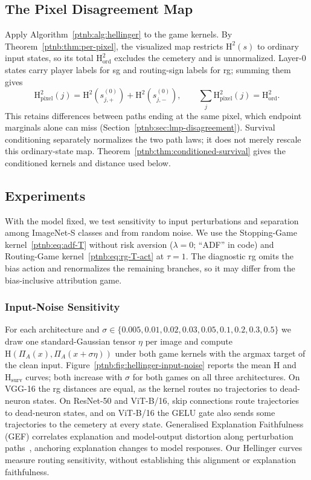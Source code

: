\subsection{The Pixel Disagreement Map}\label{sec:trajectory_pixel_map}
Apply Algorithm~\ref{ptnb:alg:hellinger} to the game kernels. By Theorem~\ref{ptnb:thm:per-pixel}, the visualized map restricts $\mathrm H^2(s)$ to ordinary input states, so its total $\mathrm H^2_{\mathrm{ord}}$ excludes the cemetery and is unnormalized. Layer-$0$ states carry player labels for \ac{sg} and routing-sign labels for \ac{rg}; summing them gives
\[
 \mathrm H^2_{\mathrm{pixel}}(j)=\mathrm H^2(s^{(0)}_{j,+})+\mathrm H^2(s^{(0)}_{j,-}),
 \qquad \sum_j\mathrm H^2_{\mathrm{pixel}}(j)=\mathrm H^2_{\mathrm{ord}}.
\]
This retains differences between paths ending at the same pixel, which endpoint marginals alone can miss (Section~\ref{ptnb:sec:lmp-disagreement}). Survival conditioning separately normalizes the two path laws; it does not merely rescale this ordinary-state map. Theorem~\ref{ptnb:thm:conditioned-survival} gives the conditioned kernels and distance used below.

\subsection{Experiments}\label{ptnb:sec:lmp-experiments}

With the model fixed, we test sensitivity to input perturbations and separation among ImageNet-S classes and from random noise. We use the Stopping-Game kernel~\eqref{ptnb:eq:adf-T} without risk aversion ($\lambda = 0$; ``ADF'' in code) and Routing-Game kernel~\eqref{ptnb:eq:rg-T-act} at $\tau = 1$. The diagnostic \ac{rg} omits the bias action and renormalizes the remaining branches, so it may differ from the bias-inclusive attribution game.

\subsubsection{Input-Noise Sensitivity}\label{ptnb:sec:input-noise-hellinger}

For each architecture and $\sigma \in \{0.005,\allowbreak 0.01,\allowbreak 0.02,\allowbreak 0.03,
    \allowbreak 0.05,\allowbreak 0.1,\allowbreak 0.2,\allowbreak 0.3,\allowbreak 0.5\}$ we draw one standard-Gaussian tensor $\eta$ per image and compute $\mathrm{H}(\Pi_A(x), \Pi_A(x + \sigma\eta))$ under both game kernels with the argmax target of the clean input. Figure~\ref{ptnb:fig:hellinger-input-noise} reports the mean $\mathrm{H}$ and $\mathrm{H}_{\mathrm{surv}}$ curves; both increase with $\sigma$ for both games on all three architectures. On VGG-16 the \ac{rg} distances are equal, as the kernel routes no trajectories to dead-neuron states. On ResNet-50 and ViT-B/16, skip connections route trajectories to dead-neuron states, and on ViT-B/16 the GELU gate also sends some trajectories to the cemetery at every state. Generalised Explanation Faithfulness (GEF) correlates explanation and model-output distortion along perturbation paths~\parencite{Hedstrom2025GEF}, anchoring explanation changes to model responses. Our Hellinger curves measure routing sensitivity, without establishing this alignment or explanation faithfulness.

